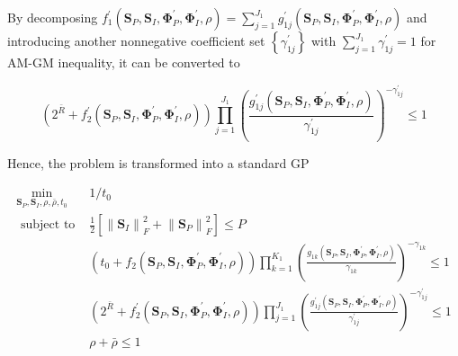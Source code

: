 By decomposing $f_1^\prime \left( {{{\mathbf{S}}_P},{{\mathbf{S}}_I},{\mathbf{\Phi }}_P^\prime ,{\mathbf{\Phi }}_I^\prime ,\rho } \right) = \sum\nolimits_{j = 1}^{{J_1}} {g_{1j}^\prime \left( {{{\mathbf{S}}_P},{{\mathbf{S}}_I},{\mathbf{\Phi }}_P^\prime ,{\mathbf{\Phi }}_I^\prime ,\rho } \right)} $ and introducing another nonnegative coefficient set $\left\{ {\gamma _{1j}^\prime } \right\}$ with $\sum\nolimits_{j = 1}^{{J_1}} {\gamma _{1j}^\prime }  = 1$ for AM-GM inequality, it can be converted to

\begin{equation}\label{eqn:mo_rate_constraint_standard}
  \left( {{2^{\bar R}} + f_2^\prime \left( {{{\mathbf{S}}_P},{{\mathbf{S}}_I},{\mathbf{\Phi }}_P^\prime ,{\mathbf{\Phi }}_I^\prime ,\rho } \right)} \right)\prod\limits_{j = 1}^{{J_1}} {{{\left( {\frac{{g_{1j}^\prime \left( {{{\mathbf{S}}_P},{{\mathbf{S}}_I},{\mathbf{\Phi }}_P^\prime ,{\mathbf{\Phi }}_I^\prime ,\rho } \right)}}{{\gamma _{1j}^\prime }}} \right)}^{ - \gamma _{1j}^\prime }}}  \leqslant 1
\end{equation}

Hence, the problem is transformed into a standard GP

\begin{eqnarray}
  {\mathop {\min }\limits_{{{\mathbf{S}}_P},{{\mathbf{S}}_I},\rho ,\bar \rho ,{t_0}} }&{1/{t_0}} \label{eqn:mo_target} \\
  {{\text{ subject to }}}&{\frac{1}{2}\left[ {\left\| {{{\mathbf{S}}_I}} \right\|_F^2 + \left\| {{{\mathbf{S}}_P}} \right\|_F^2} \right] \leqslant P} \label{eqn:mo_power_constraint} \\
  {}&{\left( {{t_0} + {f_2}\left( {{{\mathbf{S}}_P},{{\mathbf{S}}_I},{\mathbf{\Phi }}_P^\prime ,{\mathbf{\Phi }}_I^\prime ,\rho } \right)} \right)\prod\limits_{k = 1}^{{K_1}} {{{\left( {\frac{{{g_{1k}}\left( {{{\mathbf{S}}_P},{{\mathbf{S}}_I},{\mathbf{\Phi }}_P^\prime ,{\mathbf{\Phi }}_I^\prime ,\rho } \right)}}{{{\gamma _{1k}}}}} \right)}^{ - {\gamma _{1k}}}}}  \leqslant 1} \label{eqn:mo_current_constraint} \\
  {}&{\left( {{2^{\bar R}} + f_2^\prime \left( {{{\mathbf{S}}_P},{{\mathbf{S}}_I},{\mathbf{\Phi }}_P^\prime ,{\mathbf{\Phi }}_I^\prime ,\rho } \right)} \right)\prod\limits_{j = 1}^{{J_1}} {{{\left( {\frac{{g_{1j}^\prime \left( {{{\mathbf{S}}_P},{{\mathbf{S}}_I},{\mathbf{\Phi }}_P^\prime ,{\mathbf{\Phi }}_I^\prime ,\rho } \right)}}{{\gamma _{1j}^\prime }}} \right)}^{ - \gamma _{1j}^\prime }}}  \leqslant 1} \label{eqn:mo_rate_constraint} \\
  {}&{\rho  + \bar \rho  \leqslant 1 \label{eqn:mo_ratio_constraint}}
\end{eqnarray}

